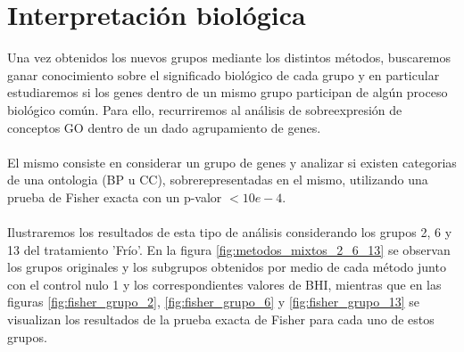 \section{Interpretación biológica}
Una vez obtenidos los nuevos grupos mediante los distintos métodos, buscaremos ganar conocimiento sobre el significado biológico de cada grupo y en particular estudiaremos si los genes dentro de un mismo grupo participan de algún proceso biológico común. Para ello, recurriremos al análisis de sobreexpresión de conceptos GO dentro de un dado agrupamiento de genes.\\\\
El mismo consiste en considerar un grupo de genes y analizar si existen categorias de una ontologia (BP u CC), sobrerepresentadas en el mismo, utilizando una prueba de Fisher exacta con un p-valor $<10e-4$.\\\\
Ilustraremos los resultados de esta tipo de análisis considerando los grupos 2, 6 y 13 del tratamiento 'Frío'. En la figura \ref{fig:metodos_mixtos_2_6_13} se observan los grupos originales y los subgrupos obtenidos por medio de cada método junto con el control nulo 1 y los correspondientes valores de BHI, mientras que en las figuras \ref{fig:fisher_grupo_2}, \ref{fig:fisher_grupo_6} y \ref{fig:fisher_grupo_13} se visualizan los resultados de la prueba exacta de Fisher para cada uno de estos grupos. 

